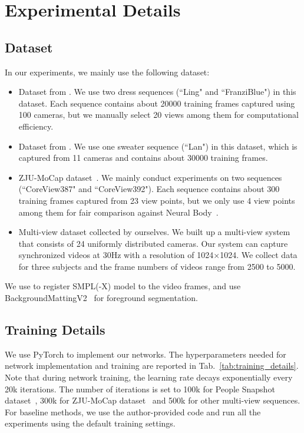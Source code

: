 \section{Experimental Details}
\label{sec:exp_details}
\subsection{Dataset}
In our experiments, we mainly use the following dataset: 
\begin{itemize}[leftmargin=*]
\setlength{\itemsep}{0pt}
\vspace{-0.2cm}
    \item Dataset from \cite{habermann2021realtimeDDC}. We use two dress sequences (``Ling" and ``FranziBlue") in this dataset. Each sequence contains about 20000 training frames captured using 100 cameras, but we manually select 20 views among them for computational efficiency. 
    \item Dataset from \cite{habermann2020deepcap}. We use one sweater sequence (``Lan") in this dataset, which is captured from 11 cameras and contains about 30000 training frames.   
    \item ZJU-MoCap dataset~\cite{peng2021neuralbody}. We mainly conduct experiments on two sequences (``CoreView387" and ``CoreView392"). Each sequence contains about 300 training frames captured from 23 view points, but we only use 4 view points among them for fair comparison against Neural Body~\cite{peng2021neuralbody}.  
    \item Multi-view dataset collected by ourselves. We built up a multi-view system that consists of 24 uniformly distributed cameras. Our system can capture synchronized videos at 30Hz with a resolution of 1024$\times$1024. We collect data for three subjects and the frame numbers of videos range from 2500 to 5000. 
\vspace{-0.2cm}
\end{itemize}

We use \cite{lightcap2021} to register SMPL(-X) model to the video frames, and use BackgroundMattingV2~\cite{BGMv2} for foreground segmentation. 

\subsection{Training Details}

We use PyTorch to implement our networks. The hyperparameters needed for network implementation and training are reported in Tab.~\ref{tab:training_details}. Note that during network training, the learning rate decays exponentially every 20k iterations. The number of iterations is set to 100k for People Snapshot dataset~\cite{alldieck2018videoavatar}, 300k for ZJU-MoCap dataset~\cite{peng2021neuralbody} and 500k for other multi-view sequences. 
For baseline methods, we use the author-provided code and run all the experiments using the default training settings.


